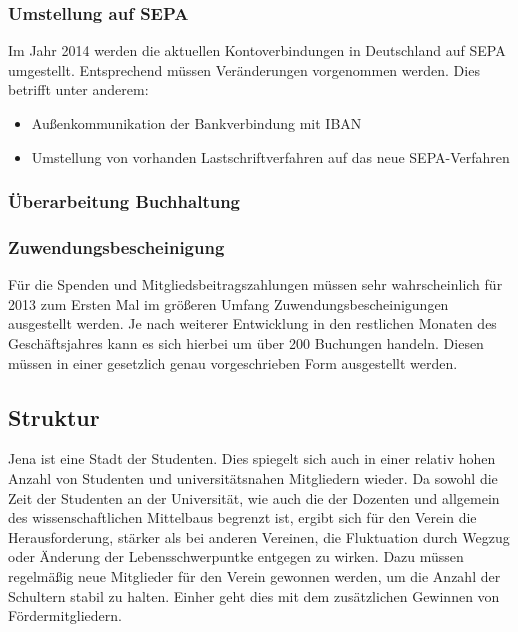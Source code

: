 \documentclass[10pt,DIV16]{scrartcl}
\begin{document}
\subsubsection{Umstellung auf SEPA}

Im Jahr 2014 werden die aktuellen Kontoverbindungen in Deutschland auf SEPA 
umgestellt. Entsprechend müssen Veränderungen vorgenommen werden. Dies 
betrifft unter anderem:

\begin{itemize}
	\item Außenkommunikation der Bankverbindung mit IBAN
	\item Umstellung von vorhanden Lastschriftverfahren auf das neue
		  SEPA-Verfahren
\end{itemize}

\subsubsection{Überarbeitung Buchhaltung}
\subsubsection{Zuwendungsbescheinigung}

Für die Spenden und Mitgliedsbeitragszahlungen müssen sehr
wahrscheinlich für 2013 zum Ersten Mal im größeren Umfang
Zuwendungsbescheinigungen ausgestellt werden. Je nach weiterer
Entwicklung in den restlichen Monaten des Geschäftsjahres kann es sich
hierbei um über 200 Buchungen handeln. Diesen müssen in einer gesetzlich
genau vorgeschrieben Form ausgestellt werden.

\subsection{Struktur}

Jena ist eine Stadt der Studenten. Dies spiegelt sich auch in einer
relativ hohen Anzahl von Studenten und universitätsnahen Mitgliedern
wieder. Da sowohl die Zeit der Studenten an der Universität, wie auch
die der Dozenten und allgemein des wissenschaftlichen Mittelbaus
begrenzt ist, ergibt sich für den Verein die Herausforderung, stärker
als bei anderen Vereinen, die Fluktuation durch Wegzug oder
Änderung der Lebensschwerpuntke entgegen zu wirken. Dazu müssen
regelmäßig neue Mitglieder für den Verein gewonnen werden, um die
Anzahl der Schultern stabil zu halten. Einher geht dies mit dem
zusätzlichen Gewinnen von Fördermitgliedern.
\end{document}
